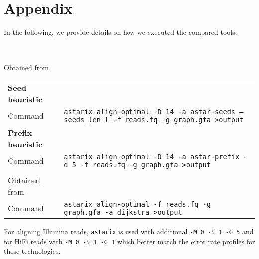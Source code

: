 \chapter{Appendix} \label{ch:appendix}

In the following, we provide details on how we executed the compared tools.

\noindent
\begin{tabular}{lp{9.5cm}}
\end{tabular}


 \\
\noindent Obtained from \astarixurl \\
\noindent
\begin{tabular}{lp{9.5cm}}
	\textbf{Seed heuristic} & \\
	\quad Command & \texttt{astarix align-optimal -D 14 -a astar-seeds --seeds\_len l -f reads.fq -g graph.gfa >output} \\
	\textbf{Prefix heuristic} & \\
	\quad Command & \texttt{astarix align-optimal -D 14 -a astar-prefix -d 5 -f reads.fq -g graph.gfa >output} \\
	\textbf{\dijkstra} & \\
	\quad Obtained from & \astarixurlwithbranch \\
	\quad Command & \texttt{astarix align-optimal -f reads.fq -g graph.gfa -a dijkstra >output}
\end{tabular}

For aligning Illumina reads, \texttt{astarix} is used with additional \texttt{-M
0 -S 1 -G 5} and for HiFi reads with \texttt{-M 0 -S 1 -G 1} which better match
the error rate profiles for these technologies.

